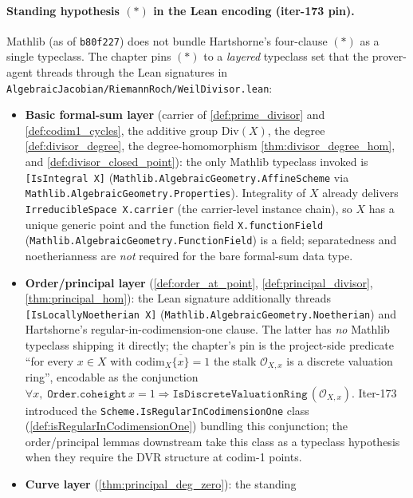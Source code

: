 \paragraph{Standing hypothesis \((*)\) in the Lean encoding (iter-173 pin).}
Mathlib (as of \texttt{b80f227}) does not bundle Hartshorne's four-clause
\((\ast)\) as a single typeclass. The chapter pins \((*)\) to a \emph{layered}
typeclass set that the prover-agent threads through the Lean signatures in
\texttt{AlgebraicJacobian/RiemannRoch/WeilDivisor.lean}:
\begin{itemize}
  \item \textbf{Basic formal-sum layer} (carrier of \ref{def:prime_divisor} and
    \ref{def:codim1_cycles}, the additive group \(\mathrm{Div}(X)\), the degree
    \ref{def:divisor_degree}, the degree-homomorphism
    \ref{thm:divisor_degree_hom}, and \ref{def:divisor_closed_point}): the
    only Mathlib typeclass invoked is \texttt{[IsIntegral X]}
    (\texttt{Mathlib.AlgebraicGeometry.AffineScheme} via
    \texttt{Mathlib.AlgebraicGeometry.Properties}). Integrality of \(X\) already
    delivers \texttt{IrreducibleSpace X.carrier} (the carrier-level instance
    chain), so \(X\) has a unique generic point and the function field
    \texttt{X.functionField} (\texttt{Mathlib.AlgebraicGeometry.FunctionField})
    is a field; separatedness and noetherianness are \emph{not} required for
    the bare formal-sum data type.
  \item \textbf{Order/principal layer} (\ref{def:order_at_point},
    \ref{def:principal_divisor}, \ref{thm:principal_hom}): the Lean
    signature additionally threads
    \texttt{[IsLocallyNoetherian X]}
    (\texttt{Mathlib.AlgebraicGeometry.Noetherian}) and Hartshorne's
    regular-in-codimension-one clause. The latter has \emph{no} Mathlib
    typeclass shipping it directly; the chapter's pin is the project-side
    predicate ``for every \(x \in X\) with \(\mathrm{codim}_X \overline{\{x\}} = 1\) the
    stalk \(\mathcal O_{X,x}\) is a discrete valuation ring'', encodable as
    the conjunction
    $\forall x,\; \texttt{Order.coheight}\,x = 1 \Rightarrow
    \texttt{IsDiscreteValuationRing}\,(\mathcal O_{X,x})$. Iter-173 introduced
    the \texttt{Scheme.IsRegularInCodimensionOne} class
    (\ref{def:isRegularInCodimensionOne}) bundling this conjunction;
    the order/principal lemmas downstream take this class as a typeclass
    hypothesis when they require the DVR structure at codim-1 points.
  \item \textbf{Curve layer} (\ref{thm:principal_deg_zero}): the standing

\end{itemize}
